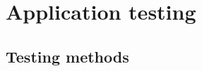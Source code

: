 \chapter{Application testing}
\label{chap:testing}

\section{Testing methods}
\label{sec:testingsec1}
